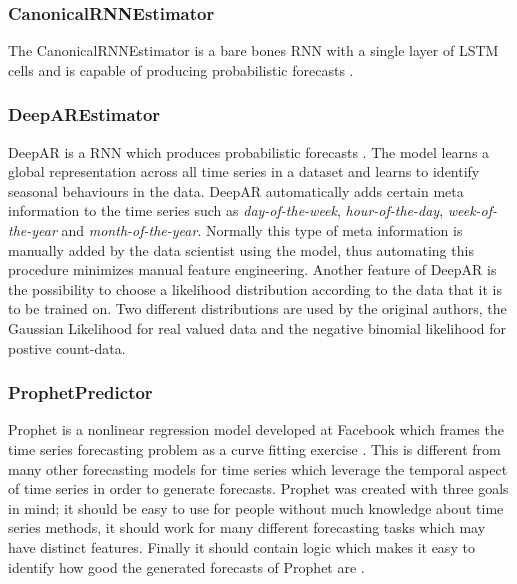 \subsubsection{CanonicalRNNEstimator}
The CanonicalRNNEstimator is a bare bones RNN with a single layer of LSTM cells and is capable of producing probabilistic forecasts \cite{gluonts-github}.

\subsubsection{DeepAREstimator}
\label{algo:deepar}
DeepAR is a RNN which produces probabilistic forecasts \cite{salinas_deepar_2019}. The model learns a global representation across all time series in a dataset and learns to identify seasonal behaviours in the data. DeepAR automatically adds certain meta information to the time series such as \textit{day-of-the-week}, \textit{hour-of-the-day}, \textit{week-of-the-year} and \textit{month-of-the-year}. Normally this type of meta information is manually added by the data scientist using the model, thus automating this procedure minimizes manual feature engineering. Another feature of DeepAR is the possibility to choose a likelihood distribution according to the data that it is to be trained on. Two different distributions are used by the original authors, the Gaussian Likelihood for real valued data and the negative binomial likelihood for postive count-data.

\subsubsection{ProphetPredictor}
Prophet is a nonlinear regression model developed at Facebook which frames the time series forecasting problem as a curve fitting exercise \cite{hyndman_forecasting_3rd}. This is different from many other forecasting models for time series which leverage the temporal aspect of time series in order to generate forecasts. Prophet was created with three goals in mind; it should be easy to use for people without much knowledge about time series methods, it should work for many different forecasting tasks which may have distinct features. Finally it should contain logic which makes it easy to identify how good the generated forecasts of Prophet are \cite{taylor_forecasting_2017}.

